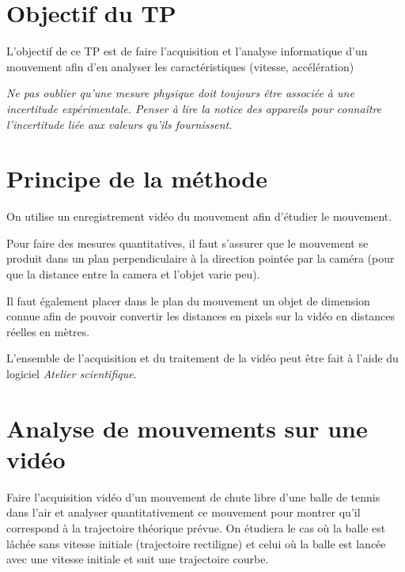 \documentclass[a4paper]{tp}
\begin{document}

\section{Objectif du TP}
L'objectif de ce TP est de faire l'acquisition et l'analyse informatique d'un mouvement afin d'en analyser les caractéristiques (vitesse, accélération)

\vspace{1em}
\textit{Ne pas oublier qu'une mesure physique doit toujours être associée à une incertitude expérimentale. Penser à lire la notice des appareils pour connaître l'incertitude liée aux valeurs qu'ils fournissent.}

\section{Principe de la méthode}
On utilise un enregistrement vidéo du mouvement afin d'étudier le mouvement. 

Pour faire des mesures quantitatives, il faut s'assurer que le mouvement se produit dans un plan perpendiculaire à la direction pointée par la caméra (pour que la distance entre la camera et l'objet varie peu).

Il faut également placer dans le plan du mouvement un objet de dimension connue afin de pouvoir convertir les distances en pixels sur la vidéo en distances réelles en mètres.

L'ensemble de l'acquisition et du traitement de la vidéo peut être fait à l'aide du logiciel \emph{Atelier scientifique}.

\section{Analyse de mouvements sur une vidéo}
Faire l'acquisition vidéo d'un mouvement de chute libre d'une balle de tennis dans l'air et analyser quantitativement ce mouvement pour montrer qu'il correspond à la trajectoire théorique prévue. On étudiera le cas où la balle est lâchée sans vitesse initiale (trajectoire rectiligne) et celui où la balle est lancée avec une vitesse initiale et suit une trajectoire courbe.
\end{document}
